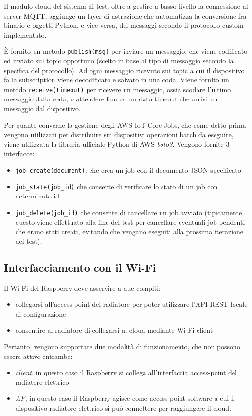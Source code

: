 \documentclass[12pt,a4paper,twoside,titlepage]{book}
\begin{document}
Il modulo cloud del sistema di test, oltre a gestire a basso livello la connessione 
al server MQTT, aggiunge un layer di astrazione che automatizza la conversione fra 
binario e oggetti Python, e vice versa, dei messaggi secondo il protocollo custom 
implementato. 

È fornito un metodo \texttt{publish(msg)} per inviare un messaggio, che viene codificato ed
inviato sul topic opportuno (scelto in base al tipo di messaggio secondo la specifica 
del protocollo). Ad ogni messaggio ricevuto sui topic a cui il dispositivo fa la 
subscription viene decodificato e salvato in una coda. Viene fornito un metodo \texttt{receive(timeout)}
per ricevere un messaggio, ossia scodare l'ultimo messaggio dalla coda, o attendere 
fino ad un dato timeout che arrivi un messaggio dal dispositivo. 

Per quanto converne la gestione degli AWS IoT Core Jobs, che come detto prima vengono 
utilizzati per distribuire sui dispositivi operazioni batch da eseguire, viene 
utilizzata la libreria ufficiale Python di AWS \textit{boto3}. Vengono fornite 
3 interfacce:
\begin{itemize}
    \item \texttt{job\_create(document)}: che crea un job con il documento JSON specificato
    \item \texttt{job\_state(job\_id)} che consente di verificare lo stato di un job con determinato id
    \item \texttt{job\_delete(job\_id)} che consente di cancellare un job avviato (tipicamente 
        questo viene effettuato alla fine del test per cancellare eventuali job pendenti che 
        erano stati creati, evitando che vengano eseguiti alla prossima iterazione dei test). 
\end{itemize}

\subsection{Interfacciamento con il Wi-Fi}

Il Wi-Fi del Raspberry deve asservire a due compiti:
\begin{itemize}
    \item collegarsi all'access point del radiatore per poter utilizzare l'API REST locale di configurazione
    \item consentire al radiatore di collegarsi al cloud mediante Wi-Fi client
\end{itemize}

Pertanto, vengono supportate due modalità di funzionamento, che non possono essere 
attive entrambe: 
\begin{itemize}
    \item \textit{client}, in questo caso il Raspberry si collega all'interfaccia
        access-point del radiatore elettrico
    \item \textit{AP}, in questo caso il Raspberry agisce come access-point software
        a cui il dispositivo radiatore elettrico si può connettere per raggiungere il
        cloud.
\end{itemize}
\end{document}

